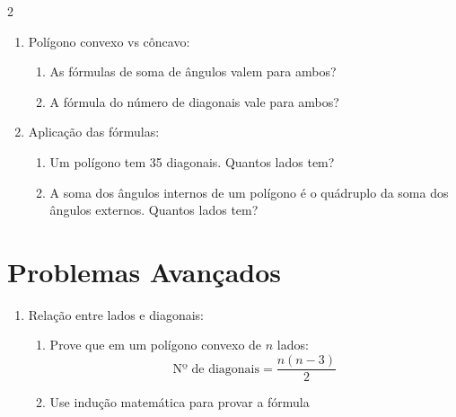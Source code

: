 \documentclass[11pt]{article}
\begin{document}
\begin{multicols}{2}
\begin{enumerate}[leftmargin=*]
\item Polígono convexo vs côncavo:
\begin{center}
\end{center}
\begin{enumerate}[label=\alph*)]
\item As fórmulas de soma de ângulos valem para ambos?
\item A fórmula do número de diagonais vale para ambos?
\end{enumerate}

\item Aplicação das fórmulas:
\begin{enumerate}[label=\alph*)]
\item Um polígono tem 35 diagonais. Quantos lados tem?
\item A soma dos ângulos internos de um polígono é o quádruplo da soma dos ângulos externos. Quantos lados tem?
\end{enumerate}

\end{enumerate}

\section*{Problemas Avançados}

\begin{enumerate}[leftmargin=*, start=11]

\item Relação entre lados e diagonais:
\begin{enumerate}[label=\alph*)]
\item Prove que em um polígono convexo de $n$ lados:
  \[
  \text{Nº de diagonais} = \frac{n(n-3)}{2}
  \]
\item Use indução matemática para provar a fórmula
\end{enumerate}


\end{enumerate}
\end{multicols}
\end{document}
